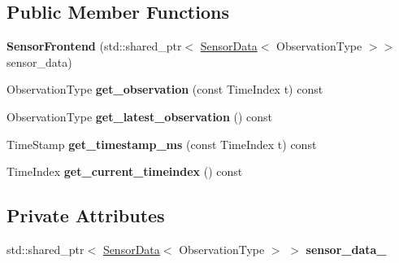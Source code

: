 \subsection*{Public Member Functions}
\begin{DoxyCompactItemize}
\item 
\mbox{\label{classrobot__interfaces_1_1SensorFrontend_a87a137bd1903267ab407718ecc8375de}} 
{\bfseries Sensor\+Frontend} (std\+::shared\+\_\+ptr$<$ \hyperlink{classrobot__interfaces_1_1SensorData}{Sensor\+Data}$<$ Observation\+Type $>$$>$ sensor\+\_\+data)
\item 
\mbox{\label{classrobot__interfaces_1_1SensorFrontend_a97eecb2518956b98b10484003aaccd48}} 
Observation\+Type {\bfseries get\+\_\+observation} (const Time\+Index t) const
\item 
\mbox{\label{classrobot__interfaces_1_1SensorFrontend_a09051196a807afa040daff02d95bee52}} 
Observation\+Type {\bfseries get\+\_\+latest\+\_\+observation} () const
\item 
\mbox{\label{classrobot__interfaces_1_1SensorFrontend_a0c6c91f9d6fc3c548e16fbc4657b80d4}} 
Time\+Stamp {\bfseries get\+\_\+timestamp\+\_\+ms} (const Time\+Index t) const
\item 
\mbox{\label{classrobot__interfaces_1_1SensorFrontend_ad7e09a895aa73549ca082e9db543dee1}} 
Time\+Index {\bfseries get\+\_\+current\+\_\+timeindex} () const
\end{DoxyCompactItemize}
\subsection*{Private Attributes}
\begin{DoxyCompactItemize}
\item 
\mbox{\label{classrobot__interfaces_1_1SensorFrontend_a19b1505aed15c8e8e62c47e5de37d27f}} 
std\+::shared\+\_\+ptr$<$ \hyperlink{classrobot__interfaces_1_1SensorData}{Sensor\+Data}$<$ Observation\+Type $>$ $>$ {\bfseries sensor\+\_\+data\+\_\+}
\end{DoxyCompactItemize}


